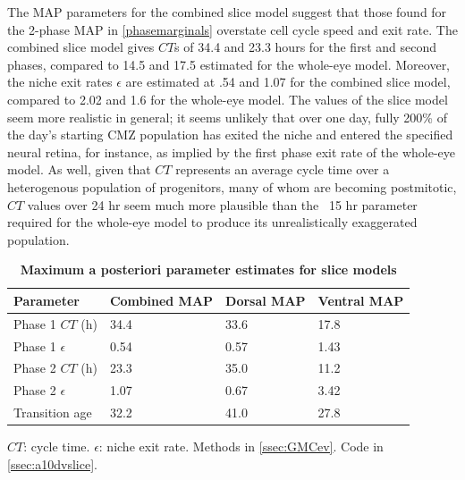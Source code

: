\documentclass{ut-thesis}
\begin{document}
\begin{NoHyper}
The MAP parameters for the combined slice model suggest that those found for the 2-phase MAP in \autoref{phasemarginals} overstate cell cycle speed and exit rate. The combined slice model gives $CT$s of 34.4 and 23.3 hours for the first and second phases, compared to 14.5 and 17.5 estimated for the whole-eye model. Moreover, the niche exit rates $\epsilon$ are estimated at .54 and 1.07 for the combined slice model, compared to 2.02 and 1.6 for the whole-eye model. The values of the slice model seem more realistic in general; it seems unlikely that over one day, fully 200\% of the day's starting CMZ population has exited the niche and entered the specified neural retina, for instance, as implied by the first phase exit rate of the whole-eye model. As well, given that $CT$ represents an average cycle time over a heterogenous population of progenitors, many of whom are becoming postmitotic, $CT$ values over 24 hr seem much more plausible than the ~15 hr parameter required for the whole-eye model to produce its unrealistically exaggerated population.

\begin{table}[!ht]
    \centering
    \caption{{\bf Maximum a posteriori parameter estimates for slice models}}
    \begin{tabular}{|l|l|l|l|}
        \hline
        {\bf Parameter} & {\bf Combined MAP} & {\bf Dorsal MAP} & {\bf Ventral MAP}\\ \hline
        Phase 1 $CT$ (h) & 34.4 & 33.6 & 17.8\\ \hline
        Phase 1 $\epsilon$ & 0.54 & 0.57 & 1.43\\ \hline
        Phase 2 $CT$ (h) & 23.3 & 35.0 & 11.2\\ \hline
        Phase 2 $\epsilon$ & 1.07 & 0.67 & 3.42\\ \hline
        Transition age & 32.2 & 41.0 & 27.8\\ \hline
        \end{tabular}
    \begin{flushleft}
        $CT$: cycle time.
        $\epsilon$: niche exit rate.
        Methods in \autoref{ssec:GMCev}.
        Code in \autoref{ssec:a10dvslice}.    
    \end{flushleft}
    \label{dvMAPtable}
\end{table}


\end{NoHyper}
\end{document}
